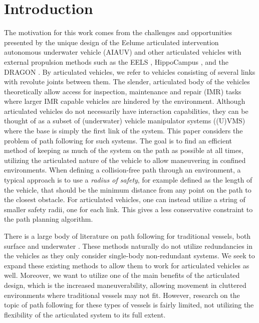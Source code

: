 \documentclass[../main.tex]{subfiles}
\begin{document}
\section{Introduction}
\label{introduction}
%
The motivation for this work comes from the challenges and opportunities presented by the unique design of the Eelume articulated intervention autonomous underwater vehicle (AIAUV) and other articulated vehicles with external propulsion methods such as the EELS \citep{carpenter2021}, HippoCampus \citep{bauschmann2023}, and the DRAGON \citep{zhao2018}. By articulated vehicles, we refer to vehicles consisting of several links with revolute joints between them. The slender, articulated body of the vehicles theoretically allow access for inspection, maintenance and repair (IMR) tasks where larger IMR capable vehicles are hindered by the environment. Although articulated vehicles do not necessarily have interaction capabilities, they can be thought of as a subset of (underwater) vehicle manipulator systems ((U)VMS) where the base is simply the first link of the system. This paper considers the problem of path following for such systems. The goal is to find an efficient method of keeping as much of the system on the path as possible at all times, utilizing the articulated nature of the vehicle to allow maneuvering in confined environments. When defining a collision-free path through an environment, a typical approach is to use a \emph{radius of safety}, for example defined as the length of the vehicle, that should be the minimum distance from any point on the path to the closest obstacle. For articulated vehicles, one can instead utilize a string of smaller safety radii, one for each link. This gives a less conservative constraint to the path planning algorithm.

There is a large body of literature on path following for traditional vessels, both surface and underwater \citep{healey1993,pettersen2001, nelson2007,lapierre2007}. These methods naturally do not utilize redundancies in the vehicles as they only consider single-body non-redundant systems. We seek to expand these existing methods to allow them to work for articulated vehicles as well. Moreover, we want to utilize one of the main benefits of the articulated design, which is the increased maneuverability, allowing movement in cluttered environments where traditional vessels may not fit. However, research on the topic of path following for these types of vessels is fairly limited, not utilizing the flexibility of the articulated system to its full extent.
\end{document}
